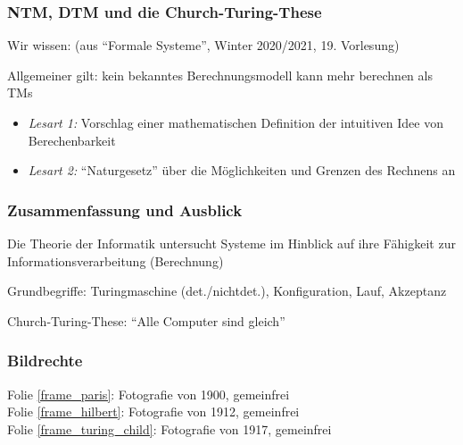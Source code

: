 \documentclass[aspectratio=1610,onlymath]{beamer}
\begin{document}
\begin{frame}\frametitle{NTM, DTM und die Church-Turing-These}

Wir wissen: {\tiny(aus "`Formale Systeme"', Winter 2020/2021, 19. Vorlesung)}

\pause

Allgemeiner gilt: kein bekanntes Berechnungsmodell kann mehr berechnen als TMs


\begin{itemize}
\item \emph{Lesart 1:} Vorschlag einer mathematischen Definition der intuitiven Idee von Berechenbarkeit
\item \emph{Lesart 2:} "`Naturgesetz"' über die Möglichkeiten und Grenzen des Rechnens an 
\end{itemize}

\end{frame}

\begin{frame}\frametitle{Zusammenfassung und Ausblick}

Die Theorie der Informatik untersucht Systeme im Hinblick auf ihre Fähigkeit zur Informationsverarbeitung (Berechnung)
\bigskip

Grundbegriffe: Turingmaschine (det./nichtdet.), Konfiguration, Lauf, Akzeptanz
\bigskip

Church-Turing-These: "`Alle Computer sind gleich"'
\bigskip


\end{frame}

\begin{frame}[t]\frametitle{Bildrechte}

Folie \ref{frame_paris}: Fotografie von 1900, gemeinfrei\\
Folie \ref{frame_hilbert}: Fotografie von 1912, gemeinfrei\\
Folie \ref{frame_turing_child}: Fotografie von 1917, gemeinfrei\\

\end{frame}
\end{document}
